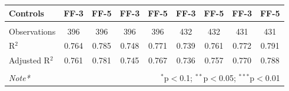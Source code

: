 \begin{tabular}{@{\extracolsep{5pt}}lcccccccc}
 
Controls & FF-3 & FF-5& FF-3 & FF-5& FF-3 & FF-5& FF-3 & FF-5\\
\hline \\[-1.8ex] 
Observations & 396 & 396 & 396 & 396 & 432 & 432 & 431 & 431 \\ 
R$^{2}$ & 0.764 & 0.785 & 0.748 & 0.771 & 0.739 & 0.761 & 0.772 & 0.791 \\ 
Adjusted R$^{2}$ & 0.761 & 0.781 & 0.745 & 0.767 & 0.736 & 0.757 & 0.770 & 0.788 \\ 
\hline 
\hline \\[-1.8ex] 
\textit{Note*}  & \multicolumn{8}{r}{$^{*}$p$<$0.1; $^{**}$p$<$0.05; $^{***}$p$<$0.01} \\ 
\end{tabular} 
